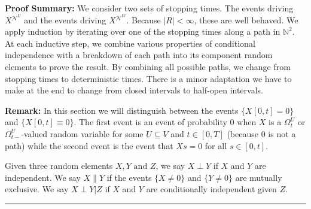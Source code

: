 \documentclass[12pt]{article}
\newcommand{\skipLine}{\vspace{12pt}}
\newcommand{\mb}{\mathbb}
\newcommand{\mc}{\mathcal}
\newcommand{\te}{\text}
\newcommand{\pfsum}{\textbf{Proof Summary: }}
\newcommand{\ind}{\hspace{24pt}}
\newcommand{\lin}{\rule{\linewidth}{0.4 pt}}
\renewcommand{\U}{U}							%
\newcommand{\UU}{W}								%
\newcommand{\UUU}{R}							%
\newcommand{\T}{T}								%
\renewcommand{\t}{t}							%
\newcommand{\sset}{\Omega}						%
\renewcommand{\tt}{s}							%
\newcommand{\X}{X}								%
\newcommand{\neigh}{\mc{N}}						%
\newcommand{\vind}[1]{^{#1}}					%
\newcommand{\vsi}[1]{^{#1}}						%
\newcommand{\ts}[1]{_{#1}}						%
\newcommand{\XX}{Y}								%
\newcommand{\XXX}{Z}							%
\newcommand{\mutex}{\|}							%
\begin{document}
\pfsum We consider two sets of stopping times. The events driving \(\X{}{}^{\neigh\vind{\U}}\) and the events driving \(\X{}{}^{\neigh\vind{\UU}}\). Because \(|\UUU| < \infty\), these are well behaved. We apply induction by iterating over one of the stopping times along a path in \(\mb{N}^2\). At each inductive step, we combine various properties of conditional independence with a breakdown of each path into its component random elements to prove the result. By combining all possible paths, we change from stopping times to deterministic times. There is a minor adaptation we have to make at the end to change from closed intervals to half-open intervals.

\skipLine

\textbf{Remark:} In this section we will distinguish between the events \(\{\X{}{[0,\t]} = 0\}\) and \(\{\X{}{[0,\t]}\equiv 0\}\). The first event is an event of probability 0 when \(\X{}{}\) is a \(\sset\vsi{\U}\ts{\t}\) or \(\sset\vsi{\U}\ts{\t-}\)-valued random variable for some \(\U\subseteq V\) and \(\t \in [0,\T]\) (because 0 is not a path) while the second event is the event that \(\X{}{\tt} = 0\) for all \(\tt \in [0,\t]\).

\ind Given three random elements \(\X{}{},\XX{}{} \te{ and } \XXX{}{}\), we say \(\X{}{}\perp \XX{}{}\) if \(\X{}{}\) and \(\XX{}{}\) are independent. We say \(\X{}{}\mutex \XX{}{}\) if the events \(\{\X{}{}\neq 0\}\) and \(\{\XX{}{} \neq 0\}\) are mutually exclusive. We say \(\X{}{}\perp \XX{}{}|\XXX{}{}\) if \(\X{}{}\) and \(\XX{}{}\) are conditionally independent given \(\XXX{}{}\).

\lin
\end{document}
